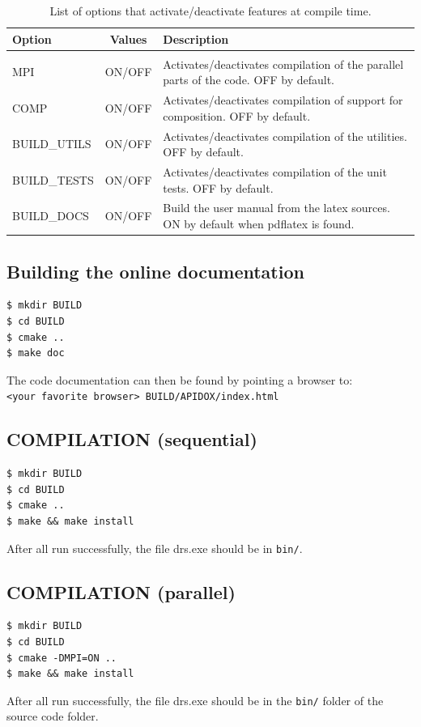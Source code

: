 \documentclass[a4paper,10pt]{book}
\begin{document}
\begin{table}[htb]
\centering
 \begin{tabular}{lcp{}}
  Option & Values & Description\\ \hline
  & & \\
  MPI& ON/OFF& Activates/deactivates compilation of the parallel parts of the
code. OFF by default.\\
  COMP& ON/OFF& Activates/deactivates compilation of support for composition.
OFF by default.\\
  BUILD\_UTILS & ON/OFF & Activates/deactivates compilation of the utilities.
OFF by default.\\
  BUILD\_TESTS & ON/OFF & Activates/deactivates compilation of the unit tests.
OFF by default.\\
  BUILD\_DOCS  & ON/OFF & Build the user manual from the latex sources. ON by
default when pdflatex is found.
 \end{tabular}
\caption{List of options that activate/deactivate features at compile time.}
\label{t:cmakeOptions}
\end{table}

\subsection{Building the online documentation}
\begin{verbatim}
$ mkdir BUILD
$ cd BUILD
$ cmake ..
$ make doc
\end{verbatim}
The code documentation can then be found by pointing a browser
to:\\
\verb|<your favorite browser> BUILD/APIDOX/index.html|

\subsection{COMPILATION (sequential)}
\begin{verbatim}
$ mkdir BUILD
$ cd BUILD
$ cmake ..
$ make && make install
\end{verbatim}
After all run successfully, the file drs.exe should be in \verb|bin/|.

\subsection{COMPILATION (parallel)}
\begin{verbatim}
$ mkdir BUILD
$ cd BUILD
$ cmake -DMPI=ON ..
$ make && make install
\end{verbatim}
After all run successfully, the file drs.exe should be in the \verb|bin/|
folder of the source code folder.
\end{document}
